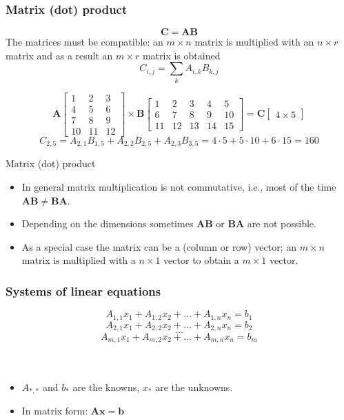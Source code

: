 \documentclass[notes]{beamer}          %
\newcommand{\vect}[1]{\bm{#1}}
\begin{document}
\begin{frame}
\frametitle{Matrix (dot) product}

    $$\vect{C} = \vect{A}\vect{B}$$
    The matrices must be compatible: an $m \times n$ matrix is multiplied with an $n \times r$ matrix and as a result an $m \times r$ matrix is obtained
    $$C_{i,j} = \sum_k A_{i,k}B_{k,j}$$

    $$
    \vect{A}
    \begin{bmatrix}
       1 & 2 & 3 \\
       4 & 5 & 6 \\
       7 & 8 & 9 \\
       10 & 11 & 12
    \end{bmatrix}
    \times
    \vect{B}
    \begin{bmatrix}
        1 & 2 & 3 & 4 & 5 \\
        6 & 7 & 8 & 9 & 10 \\
        11 & 12 & 13 & 14 & 15
    \end{bmatrix} =
    \vect{C}
    \begin{bmatrix}
       4 \times 5
    \end{bmatrix}
    $$
    $$ C_{2,5} = A_{2,1}B_{1,5} + A_{2,2}B_{2,5} + A_{2,3}B_{3,5} = 4 \cdot 5 + 5 \cdot 10 + 6 \cdot 15 = 160 $$

\end{frame}

\begin{frame}{Matrix (dot) product}
    \begin{itemize}
        \item In general matrix multiplication is not commutative, i.e., most of the time $\vect{A}\vect{B} \not = \vect{B}\vect{A}$.
        \item Depending on the dimensions sometimes $\vect{A} \vect{B}$ or $\vect{B} \vect{A}$ are not possible.
        \item As a special case the matrix can be a (column or row) vector; an $m \times n$ matrix is multiplied with a $n \times 1$ vector to obtain a $m \times 1$ vector.
    \end{itemize}
\end{frame}


\begin{frame}
\frametitle{Systems of linear equations}

$$A_{1,1}x_1 + A_{1,2}x_2 + \ldots + A_{1,n}x_n = b_1$$
$$A_{2,1}x_1 + A_{2,2}x_2 + \ldots + A_{2,n}x_n = b_2$$
$$\ldots$$
$$A_{m,1}x_1 + A_{m,2}x_2 + \ldots + A_{m,n}x_n = b_m$$
\\~\

\begin{itemize}
  \item $A_{*,*}$ and $b_*$ are the knowns, $x_*$ are the unknowns.
  \item In matrix form: $\vect{A}\vect{x} = \vect{b}$ 
\end{itemize}
\end{frame}
\end{document}
